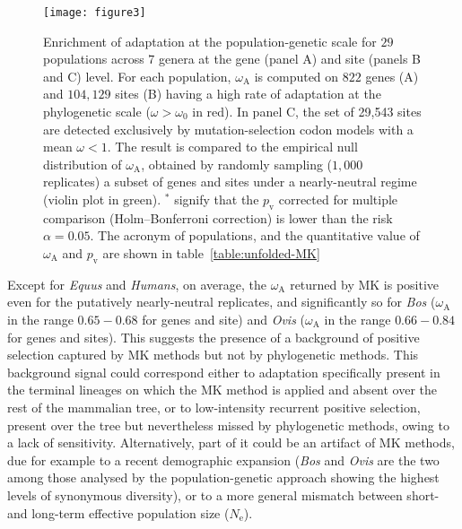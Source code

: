 \documentclass[9pt,twocolumn,twoside,lineno]{pnas-new}
\newcommand{\Ne}{N_{\mathrm{e}}}
\newcommand{\rateApop}{\omega_{\mathrm{A}}}
\begin{document}
\begin{figure*}[htb]
       \centering
       \texttt{[image: figure3]}
       \caption{
              Enrichment of adaptation at the population-genetic scale for $29$ populations across $7$ genera at the gene (panel A) and site (panels B and C) level.
              For each population, $\rateApop$ is computed on $822$ genes (A) and $104,129$ sites (B) having a high rate of adaptation at the phylogenetic scale ($\omega > \omega_0$ in red).
              In panel C, the set of 29,543 sites are detected exclusively by mutation-selection codon models with a mean $\omega < 1 $.
              The result is compared to the empirical null distribution of $\rateApop$, obtained by randomly sampling ($1,000$ replicates) a subset of genes and sites under a nearly-neutral regime (violin plot in green).
              $^*$ signify that the $p_{\mathrm{v}}$ corrected for multiple comparison (Holm–Bonferroni correction) is lower than the risk $\alpha=0.05$.
              The acronym of populations, and the quantitative value of $\rateApop$ and $p_{\mathrm{v}}$ are shown in table~\ref{table:unfolded-MK}}
       \label{fig:unfolded-MK}
\end{figure*}

Except for \textit{Equus} and \textit{Humans}, on average, the $\rateApop$ returned by MK is positive even for the putatively nearly-neutral replicates, and significantly so for \textit{Bos} ($\rateApop$ in the range $0.65-0.68$ for genes and site) and \textit{Ovis} ($\rateApop$ in the range $0.66-0.84$ for genes and sites).
This suggests the presence of a background of positive selection captured by MK methods but not by phylogenetic methods.
This background signal could correspond either to adaptation specifically present in the terminal lineages on which the MK method is applied and absent over the rest of the mammalian tree, or to low-intensity recurrent positive selection, present over the tree but nevertheless missed by phylogenetic methods, owing to a lack of sensitivity.
Alternatively, part of it could be an artifact of MK methods, due for example to a recent demographic expansion (\textit{Bos} and \textit{Ovis} are the two among those analysed by the population-genetic approach showing the highest levels of synonymous diversity), or to a more general mismatch between short- and long-term effective population size ($\Ne$)\cite{rousselle_overestimation_2018}.
\end{document}

